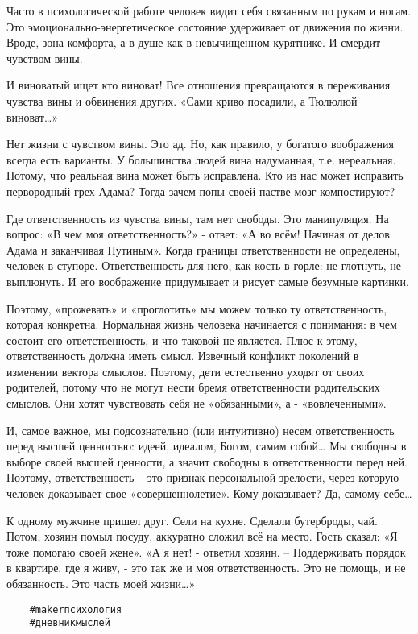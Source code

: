 Часто в психологической работе человек видит себя связанным по рукам и ногам.
Это эмоционально-энергетическое состояние удерживает от движения по жизни.
Вроде, зона комфорта, а в душе как в невычищенном курятнике. И смердит чувством
вины. 

И виноватый ищет кто виноват! Все отношения превращаются в переживания чувства
вины и обвинения других.  «Сами криво посадили, а Тюлюлюй виноват…» 

Нет жизни с чувством вины. Это ад. Но, как правило, у богатого воображения
всегда есть варианты. У большинства людей вина надуманная, т.е. нереальная.
Потому, что реальная вина может быть исправлена. Кто из нас может исправить
первородный грех Адама? Тогда зачем попы своей пастве мозг компостируют? 

Где ответственность из чувства вины, там нет свободы. Это манипуляция. На
вопрос: «В чем моя ответственность?» - ответ: «А во всём! Начиная от делов
Адама и заканчивая Путиным». Когда границы ответственности не определены,
человек в ступоре. Ответственность для него, как кость в горле: не глотнуть, не
выплюнуть. И его воображение придумывает и рисует самые безумные картинки.

Поэтому, «прожевать» и «проглотить» мы можем только ту ответственность, которая
конкретна. Нормальная жизнь человека начинается с понимания: в чем состоит его
ответственность, и что таковой не является. Плюс к этому, ответственность
должна иметь смысл. Извечный конфликт поколений в изменении вектора смыслов.
Поэтому, дети естественно уходят от своих родителей, потому что не могут нести
бремя ответственности родительских смыслов. Они хотят чувствовать себя не
«обязанными», а - «вовлеченными». 

И, самое важное, мы подсознательно (или интуитивно) несем ответственность перед
высшей ценностью: идеей, идеалом, Богом, самим собой… Мы свободны в выборе
своей высшей ценности, а значит свободны в ответственности перед ней. Поэтому,
ответственность – это признак персональной зрелости, через которую человек
доказывает свое «совершеннолетие». Кому доказывает? Да, самому себе…

К одному мужчине пришел друг. Сели на кухне. Сделали бутерброды, чай. Потом,
хозяин помыл посуду, аккуратно сложил всё на место. Гость сказал: «Я тоже
помогаю своей жене». «А я нет! - ответил хозяин. – Поддерживать порядок в
квартире, где я живу, - это так же и моя ответственность. Это не помощь, и не
обязанность. Это часть моей жизни…»

\begin{verbatim}
	#makerпсихология
	#дневникмыслей
\end{verbatim}
